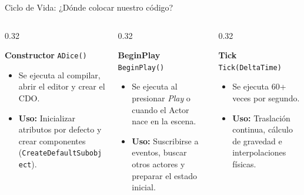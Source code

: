 \documentclass[aspectratio=169, 10pt]{beamer}
\begin{document}
\begin{frame}{Ciclo de Vida: ¿Dónde colocar nuestro código?}
    \begin{columns}[T]
        \begin{column}{0.32\textwidth}
            \begin{block}{\textbf{Constructor}}
                \texttt{ADice()}
                \begin{itemize}
                    \item Se ejecuta al compilar, abrir el editor y crear el CDO.
                    \item \textbf{Uso:} Inicializar atributos por defecto y crear componentes (\texttt{CreateDefaultSubobject}).
                \end{itemize}
            \end{block}
        \end{column}
        \begin{column}{0.32\textwidth}
            \begin{block}{\textbf{BeginPlay}}
                \texttt{BeginPlay()}
                \begin{itemize}
                    \item Se ejecuta al presionar \textit{Play} o cuando el Actor nace en la escena.
                    \item \textbf{Uso:} Suscribirse a eventos, buscar otros actores y preparar el estado inicial.
                \end{itemize}
            \end{block}
        \end{column}
        \begin{column}{0.32\textwidth}
            \begin{block}{\textbf{Tick}}
                \texttt{Tick(DeltaTime)}
                \begin{itemize}
                    \item Se ejecuta 60+ veces por segundo.
                    \item \textbf{Uso:} Traslación continua, cálculo de gravedad e interpolaciones físicas.
                \end{itemize}
            \end{block}
        \end{column}
    \end{columns}
\end{frame}
\end{document}
